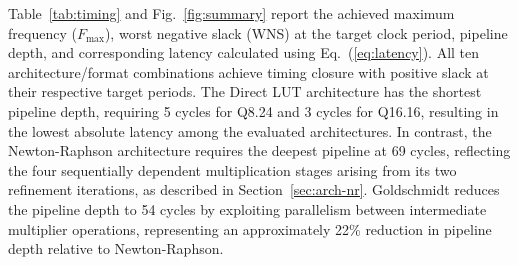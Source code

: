 \documentclass[manuscript,screen,review]{acmart}
\begin{document}
Table~\ref{tab:timing} and Fig.~\ref{fig:summary} report the achieved maximum frequency ($F_{\max}$), worst negative slack (WNS) at the target clock period, pipeline depth, and corresponding latency calculated using Eq.~(\ref{eq:latency}). All ten architecture/format combinations achieve timing closure with positive slack at their respective target periods. The Direct LUT architecture has the shortest pipeline depth, requiring 5 cycles for Q8.24 and 3 cycles for Q16.16, resulting in the lowest absolute latency among the evaluated architectures. In contrast, the Newton-Raphson architecture requires the deepest pipeline at 69 cycles, reflecting the four sequentially dependent multiplication stages arising from its two refinement iterations, as described in Section~\ref{sec:arch-nr}. Goldschmidt reduces the pipeline depth to 54 cycles by exploiting parallelism between intermediate multiplier operations, representing an approximately 22\% reduction in pipeline depth relative to Newton-Raphson.
\end{document}
